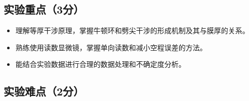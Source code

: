 \documentclass[]{../../templates/Report}%
\begin{document}
\subsection{实验重点（3分）}

\begin{itemize}
  \item 理解等厚干涉原理，掌握牛顿环和劈尖干涉的形成机制及其与膜厚的关系。
  \item 熟练使用读数显微镜，掌握单向读数和减小空程误差的方法。
  \item 能结合实验数据进行合理的数据处理和不确定度分析。
\end{itemize}

\subsection{实验难点（2分）}
\end{document}
